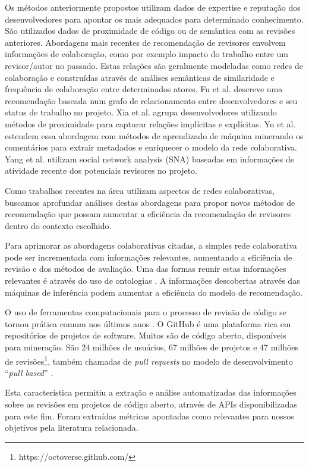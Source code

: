 \documentclass[sigconf]{acmart}
\begin{document}
Os métodos anteriormente propostos utilizam dados de expertise e reputação dos desenvolvedores para apontar os mais adequados para determinado conhecimento. São utilizados dados de proximidade de código ou de semântica com as revisões anteriores. Abordagens mais recentes de recomendação de revisores envolvem informações de colaboração, como por exemplo impacto do trabalho entre um revisor/autor no passado. Estas relações são geralmente modeladas como redes de colaboração e construídas através de análises semânticas de similaridade e frequência de colaboração entre determinados atores. Fu et al. \cite{fu2017} descreve uma recomendação baseada num grafo de relacionamento entre desenvolvedores e seu status de trabalho no projeto. Xia et al. \cite{xia2017} agrupa desenvolvedores utilizando métodos de proximidade para capturar relações implícitas e explícitas. Yu et al. \cite{yu2014,yu2014-2} estendem essa abordagem com métodos de aprendizado de máquina minerando os comentários para extrair metadados e enriquecer o modelo da rede colaborativa. Yang et al. \cite{yang2016} utilizam social network analysis (SNA) baseadas em informações de atividade recente dos potenciais revisores no projeto.

Como trabalhos recentes na área utilizam aspectos de redes colaborativas, buscamos aprofundar análises destas abordagens para propor novos métodos de recomendação que possam aumentar a eficiência da recomendação de revisores dentro do contexto escolhido.

Para aprimorar as abordagens colaborativas citadas, a simples rede colaborativa pode ser incrementada com informações relevantes, aumentando a eficiência de revisão e dos métodos de avaliação. Uma das formas reunir estas informações relevantes é através do uso de ontologias \cite{middleton2001,middleton2004}. A informações descobertas através das máquinas de inferência podem aumentar a eficiência do modelo de recomendação.

O uso de ferramentas computacionais para o processo de revisão de código se tornou prática comum nos últimos anos \cite{Bacchelli2013}. O GitHub é uma plataforma rica em repositórios de projetos de software. Muitos são de código aberto, disponíveis para mineração. São 24 milhões de usuários, 67 milhões de projetos e 47 milhões de revisões\footnote{https://octoverse.github.com/}, também chamadas de \textit{pull requests} no modelo de desenvolvimento ``\textit{pull based}'' \cite{gousios2014}.

Esta característica permitiu a extração e análise automatizadas das informações sobre as revisões em projetos de código aberto, através de APIs disponibilizadas para este fim. Foram extraídas métricas apontadas como relevantes para nossos objetivos pela literatura relacionada.
\end{document}
